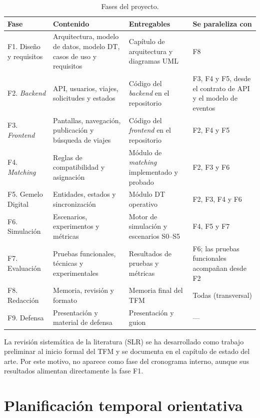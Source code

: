 \begin{table}[H]
  \centering
  \small
  \begin{tabularx}{\textwidth}{Y{0.9000} Y{1.1000} Y{1.0500} Y{0.9500}}
    \hline
    \textbf{Fase} & \textbf{Contenido} & \textbf{Entregables} & \textbf{Se paraleliza con} \\
    \hline
    F1. Diseño y requisitos & Arquitectura, modelo de datos, modelo DT, casos de uso y requisitos & Capítulo de arquitectura y diagramas UML & F8 \\
    F2. \textit{Backend} & API, usuarios, viajes, solicitudes y estados & Código del \textit{backend} en el repositorio & F3, F4 y F5, desde el contrato de API y el modelo de eventos \\
    F3. \textit{Frontend} & Pantallas, navegación, publicación y búsqueda de viajes & Código del \textit{frontend} en el repositorio & F2, F4 y F5 \\
    F4. \textit{Matching} & Reglas de compatibilidad y asignación & Módulo de \textit{matching} implementado y probado & F2, F3 y F6 \\
    F5. Gemelo Digital & Entidades, estados y sincronización & Módulo DT operativo & F2, F3, F4 y F6 \\
    F6. Simulación & Escenarios, experimentos y métricas & Motor de simulación y escenarios S0--S5 & F4, F5 y F7 \\
    F7. Evaluación & Pruebas funcionales, técnicas y experimentales & Resultados de pruebas y métricas & F6; las pruebas funcionales acompañan desde F2 \\
    F8. Redacción & Memoria, revisión y formato & Memoria final del TFM & Todas (transversal) \\
    F9. Defensa & Presentación y material de defensa & Presentación y guion & --- \\
    \hline
  \end{tabularx}
  \normalsize
  \caption{Fases del proyecto.}
  \label{tab:fases-proyecto}
\end{table}

La revisión sistemática de la literatura (SLR) se ha desarrollado como trabajo preliminar al inicio formal del TFM y se documenta en el capítulo de estado del arte. Por este motivo, no aparece como fase del cronograma interno, aunque sus resultados alimentan directamente la fase F1.

\section{Planificación temporal orientativa}

